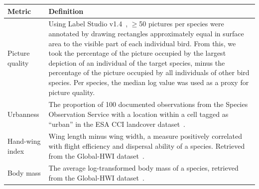 \documentclass{article}
\begin{document}
\begin{longtable}{|p{} | p{} |}
  \hline
  \textbf{Metric}    & \textbf{Definition}                                                                                                                                                                                                                                                                                                                                                                                                                                                                        \\ [0.5ex]
  \hline
  Picture quality    & Using Label Studio v1.4~\cite{Tkachenko}, $\geq$50 pictures per species were annotated by drawing rectangles approximately equal in surface area to the visible part of each individual bird. From this, we took the percentage of the picture occupied by the largest depiction of an individual of the target species, minus the percentage of the picture occupied by all individuals of other bird species. Per species, the median log value was used as a proxy for picture quality. \\
  \hline
  Urbanness          & The proportion of 100 documented observations from the Species Observation Service with a location within a cell tagged as ``urban'' in the ESA CCI landcover dataset~\cite{ESA}.                                                                                                                                                                                                                                                                                                          \\
  \hline
  Hand-wing index    & Wing length minus wing width, a measure positively correlated with flight efficiency and dispersal ability of a species. Retrieved from the Global-HWI dataset~\cite{Sheard2020}.                                                                                                                                                                                                                                                                                                          \\
  \hline
  Body mass          & The average log-transformed body mass of a species, retrieved from the Global-HWI dataset~\cite{Sheard2020}.                                                                                                                                                                                                                                                                                                                                                                               \\

\end{longtable}
\end{document}
